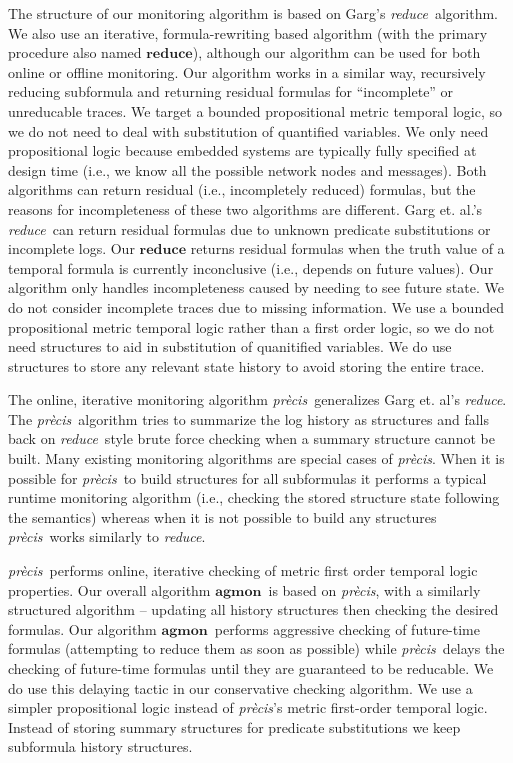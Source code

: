 \documentclass[]{llncs}
\newcommand{\agmon}{\ensuremath{\mathbf{agmon}}}
\newcommand{\precis}{\textit{pr\`ecis}}
\newcommand{\greduce}{\textit{reduce}}
\begin{document}
The structure of our monitoring algorithm is based on Garg's \greduce\ algorithm. 
We also use an iterative, formula-rewriting based algorithm (with the primary procedure also named $\mathbf{reduce}$), although our algorithm can be used for both online or offline monitoring. 
Our algorithm works in a similar way, recursively reducing subformula and returning residual formulas for ``incomplete'' or unreducable traces. We target a bounded propositional metric temporal logic, so we do not need to deal with substitution of quantified variables. We only need propositional logic because embedded systems are typically fully specified at design time (i.e., we know all the possible network nodes and messages).
%
Both algorithms can return residual (i.e., incompletely reduced) formulas, but the reasons for incompleteness of these two algorithms are different. Garg et. al.'s \greduce\ can return residual formulas due to unknown predicate substitutions or incomplete logs. Our $\mathbf{reduce}$ returns residual formulas when the truth value of a temporal formula is currently inconclusive (i.e., depends on future values).
%
Our algorithm only handles incompleteness caused by needing to see future state. We do not consider incomplete traces due to missing information. 
We use a bounded propositional metric temporal logic rather than a first order logic, so we do not need structures to aid in substitution of quanitified variables. 
We do use structures to store any relevant state history to avoid storing the entire trace.

The online, iterative monitoring algorithm \precis\ generalizes Garg et. al's \greduce. 
The \precis\ algorithm tries to summarize the log history as structures and falls back on \greduce\ style brute force checking when a summary structure cannot be built.
Many existing monitoring algorithms are special cases of \precis.
When it is possible for \precis\ to build structures for all subformulas it performs a typical runtime monitoring algorithm (i.e., checking the stored structure state following the semantics) whereas when it is not possible to build any structures \precis\ works similarly to \greduce.

\precis\ performs online, iterative checking of metric first order temporal logic properties. 
Our overall algorithm \agmon\ is based on \precis, with a similarly structured algorithm -- updating all history structures then checking the desired formulas. Our algorithm \agmon\ performs aggressive checking of future-time formulas (attempting to reduce them as soon as possible) while \precis\ delays the checking of future-time formulas until they are guaranteed to be reducable. We do use this delaying tactic in our conservative checking algorithm.
We use a simpler propositional logic instead of \precis{}'s metric first-order temporal logic. Instead of storing summary structures for predicate substitutions we keep subformula history structures.
\end{document}
